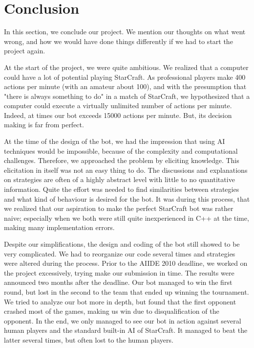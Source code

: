 
\chapter{Conclusion}
\label{chap:conclusion}

In this section, we conclude our project. We mention our thoughts on what went wrong, and how we would have done things differently if we had to start the project again.

At the start of the project, we were quite ambitious. We realized that a computer could have a lot of potential playing StarCraft. As professional players make 400 actions per minute (with an amateur about 100), and with the presumption that "there is always something to do" in a match of StarCraft, we hypothesized that a computer could execute a virtually unlimited number of actions per minute. Indeed, at times our bot exceeds 15000 actions per minute. But, its decision making is far from perfect. 

At the time of the design of the bot, we had the impression that using AI techniques would be impossible, because of the complexity and computational challenges. Therefore, we approached the problem by eliciting knowledge. This elicitation in itself was not an easy thing to do. The discussions and explanations on strategies are often of a highly abstract level with little to no quantitative information. Quite the effort was needed to find similarities between strategies and what kind of behaviour is desired for the bot. It was during this process, that we realized that our aspiration to make the perfect StarCraft bot was rather naive; especially when we both were still quite inexperienced in C++ at the time, making many implementation errors.

Despite our simplifications, the design and coding of the bot still showed to be very complicated. We had to reorganize our code several times and strategies were altered during the process. Prior to the AIIDE 2010 deadline, we worked on the project excessively, trying make our submission in time. The results were announced two months after the deadline. Our bot managed to win the first round, but lost in the second to the team that ended up winning the tournament. We tried to analyze our bot more in depth, but found that the first opponent crashed most of the games, making us win due to disqualification of the opponent. In the end, we only managed to see our bot in action against several human players and the standard built-in AI of StarCraft. It managed to beat the latter several times, but often lost to the human players.

